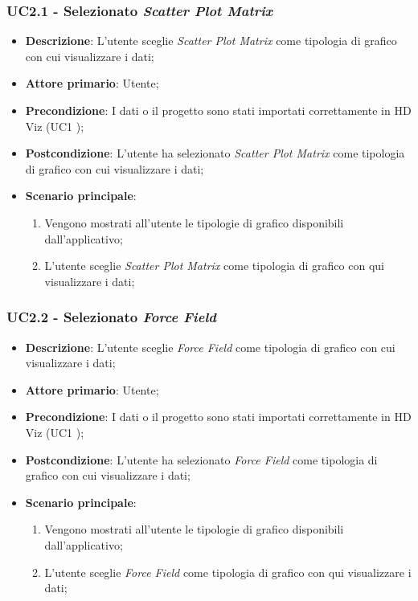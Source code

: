 \subsubsection{UC2.1 - Selezionato \emph{Scatter Plot Matrix}}
\label{ssub:uc2.1}

\begin{itemize}
	\item \textbf{Descrizione}: L'utente sceglie \emph{Scatter Plot Matrix} come tipologia di grafico con cui visualizzare i dati;
	\item \textbf{Attore primario}: Utente;
	\item \textbf{Precondizione}: I dati o il progetto sono stati importati correttamente in HD Viz (UC1 );
	\item \textbf{Postcondizione}: L'utente ha selezionato \emph{Scatter Plot Matrix} come tipologia di grafico con cui visualizzare i dati;
	\item \textbf{Scenario principale}:
		\begin{enumerate}
			\item Vengono mostrati all'utente le tipologie di grafico disponibili dall'applicativo;
			\item L'utente sceglie \emph{Scatter Plot Matrix} come tipologia di grafico con qui visualizzare i dati;
		\end{enumerate}
\end{itemize}

\subsubsection{UC2.2 - Selezionato \emph{Force Field}}
\label{ssub:uc2.2}

\begin{itemize}
	\item \textbf{Descrizione}: L'utente sceglie \emph{Force Field} come tipologia di grafico con cui visualizzare i dati;
	\item \textbf{Attore primario}: Utente;
	\item \textbf{Precondizione}: I dati o il progetto sono stati importati correttamente in HD Viz (UC1 );
	\item \textbf{Postcondizione}: L'utente ha selezionato \emph{Force Field} come tipologia di grafico con cui visualizzare i dati;
	\item \textbf{Scenario principale}:
		\begin{enumerate}
			\item Vengono mostrati all'utente le tipologie di grafico disponibili dall'applicativo;
			\item L'utente sceglie \emph{Force Field} come tipologia di grafico con qui visualizzare i dati;
		\end{enumerate}
\end{itemize}


